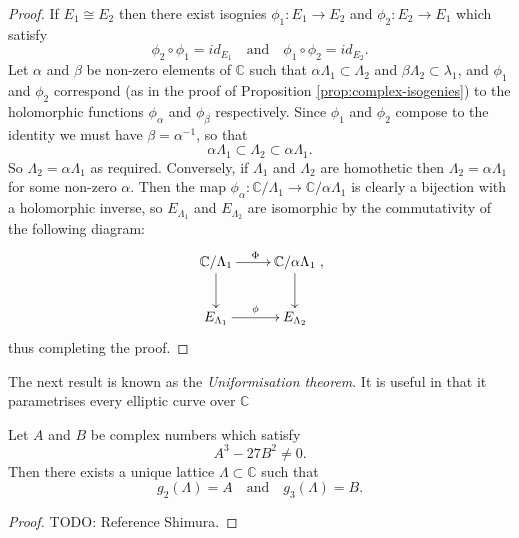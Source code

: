  \begin{proof}
   If $E_{1} \cong E_{2}$ then there exist isognies $\phi_{1} : E_{1} \rightarrow
   E_{2}$ and $\phi_{2} : E_{2} \rightarrow E_{1}$ which satisfy
   \begin{equation*}
     \phi_{2} \circ \phi_{1} = id_{E_{1}} \quad \text{and} \quad \phi_{1} \circ
     \phi_{2} = id_{E_{2}}.
   \end{equation*}
   Let $\alpha$ and $\beta$ be non-zero elements of $\mathbb{C}$ such that $\alpha
   \Lambda_{1} \subset \Lambda_{2}$ and $\beta \Lambda_{2} \subset \lambda_{1}$, and
   $\phi_{1}$ and $\phi_{2}$ correspond (as in the proof of Proposition
   \ref{prop:complex-isogenies}) to the holomorphic functions $\phi_{\alpha}$ and
   $\phi_{\beta}$ respectively.  Since $\phi_{1}$ and $\phi_{2}$ compose to the
   identity we must have $\beta = \alpha^{-1}$, so that
   \begin{equation*}
     \alpha \Lambda_{1} \subset \Lambda_{2} \subset \alpha \Lambda_{1}.
   \end{equation*}
   So $\Lambda_{2} = \alpha \Lambda_{1}$ as required.  Conversely, if $\Lambda_{1}$
   and $\Lambda_{2}$ are homothetic then $\Lambda_{2} = \alpha \Lambda_{1}$ for some
   non-zero $\alpha$.  Then the map $\phi_{\alpha} : \mathbb{C} / \Lambda_{1}
   \rightarrow \mathbb{C} / \alpha \Lambda_{1}$ is clearly a bijection with a
   holomorphic inverse, so $E_{\Lambda_{1}}$ and $E_{\Lambda_{2}}$ are isomorphic by
   the commutativity of the following diagram:
   \begin{equation*}
     \xymatrix{
       \mathbb{C} / \Lambda_{1} \ar[d] \ar[r]^{\Phi} & \mathbb{C} / \alpha \Lambda_{1} \ar[d]\\
       E_{\Lambda_{1}} \ar[r]^{\phi }& E_{\Lambda_{2}}
     },
   \end{equation*}
   thus completing the proof.
 \end{proof}

 The next result is known as the \emph{Uniformisation theorem}.  It is useful in that
 it parametrises every elliptic curve over $\mathbb{C}$

 \begin{thm}
   \label{thm:uniformisation-theorem}
   Let $A$ and $B$ be complex numbers which satisfy
   \begin{equation*}
     A^{3} - 27B^{2} \neq 0.
   \end{equation*}
   Then there exists a unique lattice $\Lambda \subset \mathbb{C}$ such that
   \begin{equation*}
     g_{2}(\Lambda) = A \quad \text{and} \quad g_{3}(\Lambda) = B.
   \end{equation*}
 \end{thm}
 \begin{proof}
   TODO: Reference Shimura.
 \end{proof}

